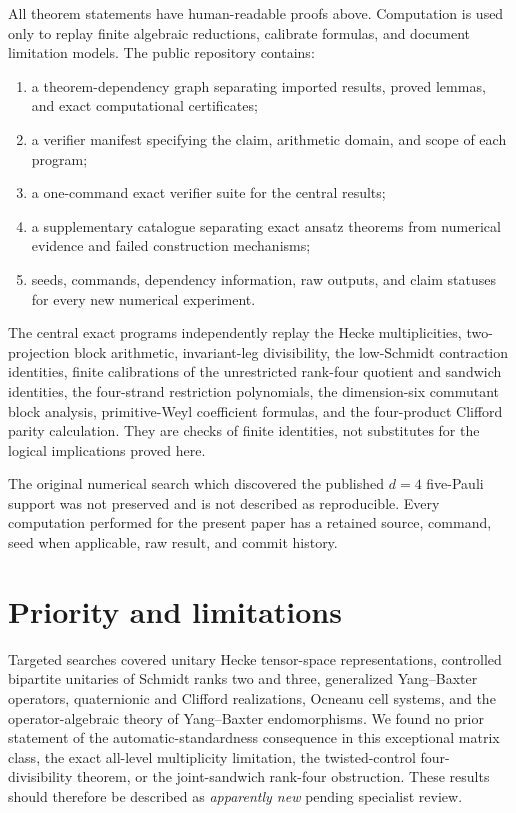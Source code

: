 \documentclass[11pt]{article}
\theoremstyle{definition}
\theoremstyle{remark}
\begin{document}
All theorem statements have human-readable proofs above. Computation is
used only to replay finite algebraic reductions, calibrate formulas, and
document limitation models. The public repository contains:
\begin{enumerate}[label=\textup{(\roman*)}]
\item a theorem-dependency graph separating imported results, proved
lemmas, and exact computational certificates;
\item a verifier manifest specifying the claim, arithmetic domain, and
scope of each program;
\item a one-command exact verifier suite for the central results;
\item a supplementary catalogue separating exact ansatz theorems from
numerical evidence and failed construction mechanisms;
\item seeds, commands, dependency information, raw outputs, and claim
statuses for every new numerical experiment.
\end{enumerate}

The central exact programs independently replay the Hecke multiplicities,
two-projection block arithmetic, invariant-leg divisibility, the
low-Schmidt contraction identities, finite calibrations of the unrestricted
rank-four quotient and sandwich identities, the four-strand restriction
polynomials, the dimension-six commutant block analysis, primitive-Weyl
coefficient formulas, and the four-product Clifford parity calculation.
They are checks of finite identities, not substitutes for the logical
implications proved here.

The original numerical search which discovered the published \(d=4\)
five-Pauli support was not preserved and is not described as reproducible.
Every computation performed for the present paper has a retained source,
command, seed when applicable, raw result, and commit history.

\section*{Priority and limitations}

Targeted searches covered unitary Hecke tensor-space representations,
controlled bipartite unitaries of Schmidt ranks two and three, generalized
Yang--Baxter operators, quaternionic and Clifford realizations, Ocneanu
cell systems, and the operator-algebraic theory of Yang--Baxter
endomorphisms. We found no prior statement of the automatic-standardness
consequence in this exceptional matrix class, the exact all-level
multiplicity limitation, the twisted-control four-divisibility theorem, or
the joint-sandwich rank-four obstruction. These results should therefore
be described as \emph{apparently new} pending specialist review.
\end{document}

